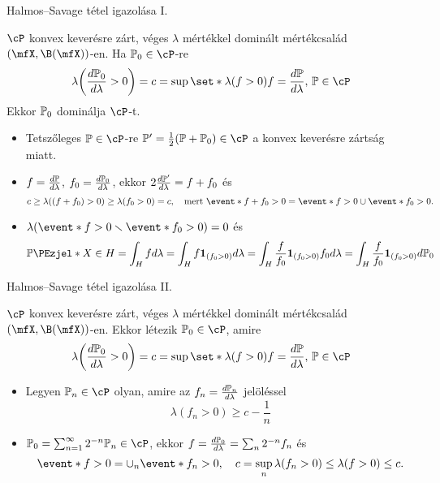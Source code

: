 \documentclass[aspectratio=169,notheorems,9pt,\option]{beamer}
\begin{document}
\begin{frame}{Halmos--Savage tétel igazolása I.}
\begin{lemma}
  $\cP$ konvex keverésre zárt, véges $\lambda$ mértékkel dominált mértékcsalád 
  $(\mfX,\B(\mfX))$-en. Ha $\P[0]\in\cP$-re
  \begin{displaymath}
    \lambda\zjel*{\frac{d\P[0]}{d\lambda}>0}=c=\sup\set*{\lambda(f>0)}{f=\frac{d\P}{d\lambda},\,\P\in\cP}
  \end{displaymath}
  Ekkor $\P[0]$ dominálja $\cP$-t.
\end{lemma}
\begin{itemize}
  \item Tetszőleges $\P\in\cP$-re $\P'=\frac12(\P+\P[0])\in\cP$ a konvex keverésre zártság miatt.
  \item $f=\frac{d\P}{d\lambda}$, $f_0=\frac{d\P[0]}{d\lambda}$, 
  ekkor $2\frac{d\P'}{d\lambda}=f+f_0$ és 
  \begin{displaymath}
    c\geq \lambda((f+f_0)>0)\geq \lambda(f_0>0)=c, 
    \quad\text{mert $\event*{f+f_0>0}=\event*{f>0}\cup\event*{f_0>0}$}.
  \end{displaymath}
  \item $\lambda(\event*{f>0}\setminus\event*{f_0>0})=0$ és 
  \begin{displaymath}
    \P{X\in H}
    =\int_H f d\lambda
    =\int_H f\I{f_0>0}d\lambda
    =\int_H \frac{f}{f_0}\I{f_0>0}f_0d\lambda
    =\int_H \frac{f}{f_0}\I{f_0>0}d\P[0]
  \end{displaymath} 
\end{itemize}
\end{frame}

\begin{frame}{Halmos--Savage tétel igazolása II.}
\begin{lemma}
  $\cP$ konvex keverésre zárt, véges $\lambda$ mértékkel dominált mértékcsalád 
  $(\mfX,\B(\mfX))$-en. Ekkor létezik $\P[0]\in\cP$, amire
  \begin{displaymath}
    \lambda\zjel*{\frac{d\P[0]}{d\lambda}>0}=c=\sup\set*{\lambda(f>0)}{f=\frac{d\P}{d\lambda},\,\P\in\cP}
  \end{displaymath}
\end{lemma}
\begin{itemize}
  \item Legyen $\P[n]\in\cP$ olyan, amire az $f_n=\frac{d\P[n]}{d\lambda}$ jelöléssel
  \begin{displaymath}
    \lambda(f_n>0)\geq c-\frac1n
  \end{displaymath}
  \item $\P[0]=\sum_{n=1}^{\infty} 2^{-n} \P[n]\in\cP$, ekkor 
  $f=\frac{d\P[0]}{d\lambda}=\sum_n 2^{-n}f_n$ és 
  \begin{displaymath}
    \event*{f>0}=\cup_n\event*{f_n>0},\quad c = \sup_n\lambda(f_n>0)\leq \lambda(f>0)\leq c.
  \end{displaymath}
\end{itemize}
\end{frame}
\end{document}
